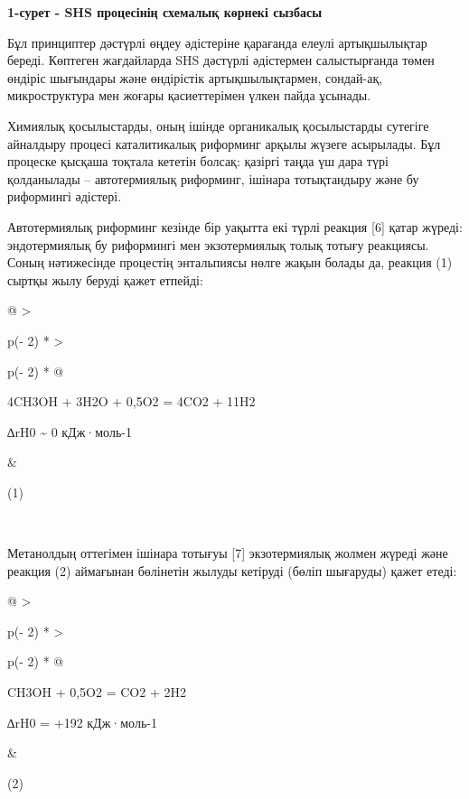 {\bfseries 1-сурет - SHS процесінің схемалық көрнекі сызбасы}

Бұл принциптер дәстүрлі өңдеу әдістеріне қарағанда елеулі артықшылықтар
береді. Көптеген жағдайларда SHS дәстүрлі әдістермен салыстырғанда төмен
өндіріс шығындары және өндірістік артықшылықтармен, сондай-ақ,
микроструктура мен жоғары қасиеттерімен үлкен пайда ұсынады.

Химиялық қосылыстарды, оның ішінде органикалық қосылыстарды сутегіге
айналдыру процесі каталитикалық риформинг арқылы жүзеге асырылады. Бұл
процеске қысқаша тоқтала кететін болсақ: қазіргі таңда үш дара түрі
қолданылады -- автотермиялық риформинг, ішінара тотықтандыру және бу
риформингі әдістері.

Автотермиялық риформинг кезінде бір уақытта екі түрлі реакция {[}6{]}
қатар жүреді: эндотермиялық бу риформингі мен экзотермиялық толық тотығу
реакциясы. Соның нәтижесінде процестің энтальпиясы нөлге жақын болады
да, реакция (1) сыртқы жылу беруді қажет етпейді:

\begin{longtable}[]{@{}
  >{\raggedright\arraybackslash}p{(\columnwidth - 2\tabcolsep) * }
  >{\raggedright\arraybackslash}p{(\columnwidth - 2\tabcolsep) * }@{}}
\toprule\noalign{}
\begin{minipage}[b]{\linewidth}\raggedright
4CH3OH + 3H2O + 0,5O2 = 4CO2 + 11H2

∆rH0 \textasciitilde{} 0 кДж·моль-1
\end{minipage} & \begin{minipage}[b]{\linewidth}\raggedright
(1)
\end{minipage} \\
\midrule\noalign{}
\endhead
\bottomrule\noalign{}
\endlastfoot
\end{longtable}

Метанолдың оттегімен ішінара тотығуы {[}7{]} экзотермиялық жолмен жүреді
және реакция (2) аймағынан бөлінетін жылуды кетіруді (бөліп шығаруды)
қажет етеді:

\begin{longtable}[]{@{}
  >{\raggedright\arraybackslash}p{(\columnwidth - 2\tabcolsep) * }
  >{\raggedright\arraybackslash}p{(\columnwidth - 2\tabcolsep) * }@{}}
\toprule\noalign{}
\begin{minipage}[b]{\linewidth}\raggedright
CH3OH + 0,5O2 = CO2 + 2H2

∆rH0 = +192 кДж·моль-1
\end{minipage} & \begin{minipage}[b]{\linewidth}\raggedright
(2)
\end{minipage} \\
\midrule\noalign{}
\endhead
\bottomrule\noalign{}
\endlastfoot
\end{longtable}


